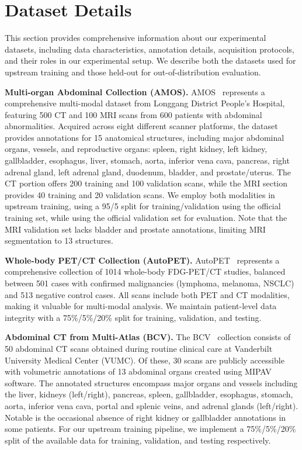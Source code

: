 \clearpage
\setcounter{page}{1}
\maketitlesupplementary



\section{Dataset Details}




This section provides comprehensive information about our experimental datasets, including data characteristics, annotation details, acquisition protocols, and their roles in our experimental setup. We describe both the datasets used for upstream training and those held-out for out-of-distribution evaluation.



\noindent\textbf{Multi-organ Abdominal Collection (AMOS).} AMOS~\cite{ji2022amos} represents a comprehensive multi-modal dataset from Longgang District People's Hospital, featuring 500 CT and 100 MRI scans from 600 patients with abdominal abnormalities. Acquired across eight different scanner platforms, the dataset provides annotations for 15 anatomical structures, including major abdominal organs, vessels, and reproductive organs: spleen, right kidney, left kidney, gallbladder, esophagus, liver, stomach, aorta, inferior vena cava, pancreas, right adrenal gland, left adrenal gland, duodenum, bladder, and prostate/uterus. The CT portion offers 200 training and 100 validation scans, while the MRI section provides 40 training and 20 validation scans. We employ both modalities in upstream training, using a 95/5 split for training/validation using the official training set, while using the official validation set for evaluation. Note that the MRI validation set lacks bladder and prostate annotations, limiting MRI segmentation to 13 structures.


\noindent\textbf{Whole-body PET/CT Collection (AutoPET).} AutoPET~\cite{gatidis2022whole} represents a comprehensive collection of 1014 whole-body FDG-PET/CT studies, balanced between 501 cases with confirmed malignancies (lymphoma, melanoma, NSCLC) and 513 negative control cases. All scans include both PET and CT modalities, making it valuable for multi-modal analysis. We maintain patient-level data integrity with a 75\%/5\%/20\% split for training, validation, and testing.


\noindent\textbf{Abdominal CT from Multi-Atlas (BCV).} The BCV~\cite{bcv}  collection consists of 50 abdominal CT scans obtained during routine clinical care at Vanderbilt University Medical Center (VUMC). Of these, 30 scans are publicly accessible with volumetric annotations of 13 abdominal organs created using MIPAV software. The annotated structures encompass major organs and vessels including the liver, kidneys (left/right), pancreas, spleen, gallbladder, esophagus, stomach, aorta, inferior vena cava, portal and splenic veins, and adrenal glands (left/right). Notable is the occasional absence of right kidney or gallbladder annotations in some patients. For our upstream training pipeline, we implement a 75\%/5\%/20\% split of the available data for training, validation, and testing respectively.


